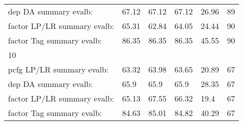\begin{longtable}{|p{}|p{}|p{}|p{}|p{}|p{}|}
    dep DA summary evalb:  &  67.12  &  67.12  &  67.12  &  26.96  &  89\\
    factor LP/LR summary evalb:  &  65.31  &  62.84  &  64.05  &  24.44  &  90\\
    factor Tag summary evalb:  &  86.35  &  86.35  &  86.35  &  45.55  &  90\\
    10 & 	 & 	 & 	 & 	 & 	\\
    pcfg LP/LR summary evalb:  &  63.32  &  63.98  &  63.65  &  20.89  &  67\\
    dep DA summary evalb:  &  65.9  &  65.9  &  65.9  &  28.35  &  67\\
    factor LP/LR summary evalb:  &  65.13  &  67.55  &  66.32  &  19.4  &  67\\
    factor Tag summary evalb:  &  84.63  &  85.01  &  84.82  &  40.29  &  67
    \label{tab:cintil_result_full}
\end{longtable}
